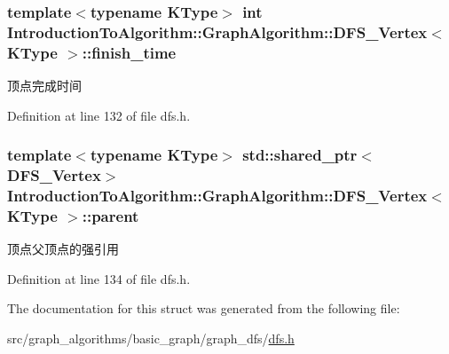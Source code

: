 \subsubsection[{finish\+\_\+time}]{\setlength{\rightskip}{0pt plus 5cm}template$<$typename K\+Type$>$ int {\bf Introduction\+To\+Algorithm\+::\+Graph\+Algorithm\+::\+D\+F\+S\+\_\+\+Vertex}$<$ K\+Type $>$\+::finish\+\_\+time}\label{struct_introduction_to_algorithm_1_1_graph_algorithm_1_1_d_f_s___vertex_aa0f17c70784c1dcc199487e519814e61}
顶点完成时间 

Definition at line 132 of file dfs.\+h.

\hypertarget{struct_introduction_to_algorithm_1_1_graph_algorithm_1_1_d_f_s___vertex_ad243c81b3c0705a136b6a1e5debdb6ed}{}
\subsubsection[{parent}]{\setlength{\rightskip}{0pt plus 5cm}template$<$typename K\+Type$>$ std\+::shared\+\_\+ptr$<${\bf D\+F\+S\+\_\+\+Vertex}$>$ {\bf Introduction\+To\+Algorithm\+::\+Graph\+Algorithm\+::\+D\+F\+S\+\_\+\+Vertex}$<$ K\+Type $>$\+::parent}\label{struct_introduction_to_algorithm_1_1_graph_algorithm_1_1_d_f_s___vertex_ad243c81b3c0705a136b6a1e5debdb6ed}
顶点父顶点的强引用 

Definition at line 134 of file dfs.\+h.



The documentation for this struct was generated from the following file\+:\begin{DoxyCompactItemize}
\item 
src/graph\+\_\+algorithms/basic\+\_\+graph/graph\+\_\+dfs/\hyperlink{dfs_8h}{dfs.\+h}\end{DoxyCompactItemize}

